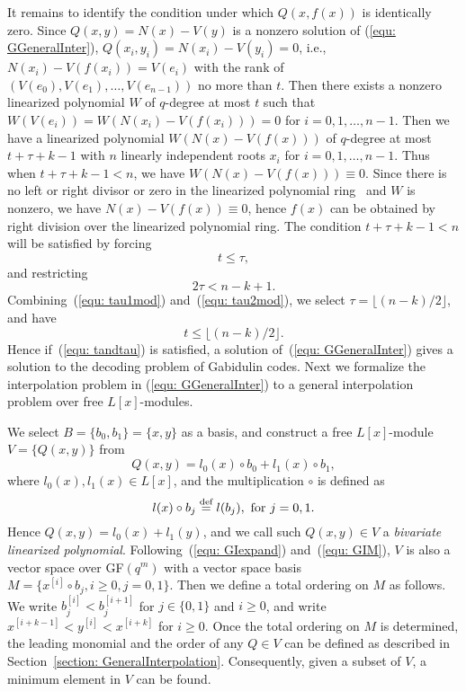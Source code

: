 \documentclass[11pt,onecolumn,draftcls]{IEEEtran}
\newcommand{\df}{\stackrel{\mbox{\scriptsize def}}{=}}
\begin{document}
It remains to identify the condition under which $Q(x, f(x))$ is identically zero. Since $Q(x, y) = N(x) - V(y)$ is a nonzero solution of (\ref{equ: GGeneralInter}), $Q(x_i, y_i) = N(x_i) - V(y_i) = 0$, i.e., $N(x_i) - V(f(x_i)) = V(e_i)$ with the rank of $(V(e_0), V(e_1), \ldots, V(e_{n-1}))$ no more than $t$. Then there exists a nonzero linearized polynomial $W$ of $q$-degree at most $t$ such that $W(V(e_i)) = W(N(x_i) - V(f(x_i))) = 0$ for $i = 0, 1, \ldots, n-1$. Then we have a linearized polynomial $W(N(x) - V(f(x)))$ of $q$-degree at most $t + \tau + k -1$ with $n$ linearly independent roots $x_i$ for $i = 0, 1, \ldots, n-1$. Thus when $t + \tau + k -1 < n$, we have $W(N(x) - V(f(x))) \equiv 0$. Since there is no left or right divisor or zero in the linearized polynomial ring~\cite{ore_ams33} and $W$ is nonzero, we have $N(x) - V(f(x)) \equiv 0$, hence $f(x)$ can be obtained by right division over the linearized polynomial ring. The condition $t + \tau + k -1 < n$ will be satisfied by forcing
\begin{equation} \label{equ: req}
t \le \tau,
\end{equation}
and restricting
\begin{equation} \label{equ: tau2mod}
2 \tau < n - k + 1.
\end{equation}
Combining~(\ref{equ: tau1mod}) and~(\ref{equ: tau2mod}), we select $\tau = \lfloor (n - k) / 2 \rfloor$, and have
\begin{equation} \label{equ: tandtau}
t \le \lfloor (n-k)/2 \rfloor.
\end{equation}
Hence if~(\ref{equ: tandtau}) is satisfied, a solution of~(\ref{equ: GGeneralInter}) gives a solution to the decoding problem of Gabidulin codes. Next we formalize the interpolation problem in (\ref{equ: GGeneralInter}) to a general interpolation problem over free $L[x]$-modules.

We select $B = \{ b_0, b_1\} = \{ x, y\}$ as a basis, and construct a free $L[x]$-module $V = \{Q(x,y)\}$ from
\begin{equation} \label{eq: Y_basisGB}
Q(x,y) = l_0(x) \circ b_0 + l_1(x) \circ b_1,
\end{equation}
where $l_0(x), l_1(x) \in L[x]$, and the multiplication $\circ$ is defined as
\begin{equation} \label{equ: GIcirc}
l(x) \circ b_j \df l(b_j),  \textrm{  for } j = 0, 1.
\end{equation}
Hence $Q(x,y)=l_0(x) + l_1(y)$, and we call such $Q(x,y) \in V$ a  \emph{bivariate linearized polynomial}. Following~(\ref{equ: GIexpand}) and~(\ref{equ: GIM}), $V$ is also a vector space over GF$(q^m)$ with a vector space basis $M =  \{ x^{[i]} \circ b_{j}, i\ge 0, j = 0, 1\}$. Then we define a total ordering on $M$ as follows. We write $b_j^{[i]} < b_j^{[i+1]}$ for $j \in \{0,1\}$ and $i \ge 0$, and write $x^{[i+k-1]} < y^{[i]} < x^{[i+k]}$ for $i \ge 0$. Once the total ordering on $M$ is determined, the leading monomial and the order of any $Q\in V$ can be defined as described in Section~\ref{section: GeneralInterpolation}. Consequently, given a subset of $V$, a minimum element in $V$ can be found.
\end{document}
